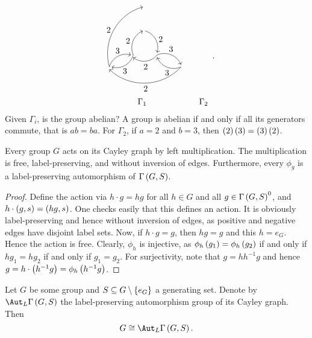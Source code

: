 \begin{example}
\begin{itemize}
$$\begin{array}{ccc}
\begin{tikzpicture}
\draw [->] (0, -1) to [bend left=45] node[right]{$ 2 $} (0.5, -1.9);
\draw [->] (-0.5, -2) to [bend left=45] node[left]{$ 2 $} (-0.1, -1);
\draw [->] (-0.5, -2) to [bend left=45] node[below]{$ 3 $} (-1.4, -2.5);
\draw [->] (0.5, -2) to [bend left=45] node[below]{$ 2 $} (-0.5, -2.1);
\draw [->] (0.5, -2) to [bend left=45] node[above]{$ 3 $} (1.5, -2.4);
\draw [->] (-1.5, -2.5) to [bend left=45] node[left]{$ 2 $} (-0.1, 0);
\draw [->] (-1.5, -2.5) to [bend left=45] node[above]{$ 3 $} (-0.6, -2);
\draw [->] (1.5, -2.5) to [bend left=45] node[below]{$ 3 $} (0.5, -2.1);
\draw [->] (1.5, -2.5) to [bend left=45] node[below]{$ 2 $} (-1.5, -2.6);
\end{tikzpicture}
\\
\Gamma_1 & & \Gamma_2
\end{array}.
$$
Given $ \Gamma_i $, is the group abelian? A group is abelian if and only if all its generators commute, that is $ ab = ba $. For $ \Gamma_2 $, if $ a = 2 $ and $ b = 3 $, then $ \br{2}\br{3} = \br{3}\br{2} $.
\end{itemize}
\end{example}

\pagebreak

\begin{lemma}
\label{lem:1.2.11}
Every group $ G $ acts on its Cayley graph by left multiplication. The multiplication is free, label-preserving, and without inversion of edges. Furthermore, every $ \phi_g $ is a label-preserving automorphism of $ \Gamma\br{G, S} $.
\end{lemma}

\begin{proof}
Define the action via $ h \cdot g = hg $ for all $ h \in G $ and all $ g \in \Gamma\br{G, S}^0 $, and $ h \cdot \br{g, s} = \br{hg, s} $. One checks easily that this defines an action. It is obviously label-preserving and hence without inversion of edges, as positive and negative edges have disjoint label sets. Now, if $ h \cdot g = g $, then $ hg = g $ and this $ h = e_G $. Hence the action is free. Clearly, $ \phi_h $ is injective, as $ \phi_h\br{g_1} = \phi_h\br{g_2} $ if and only if $ hg_1 = hg_2 $ if and only if $ g_1 = g_2 $. For surjectivity, note that $ g = hh^{-1}g $ and hence $ g = h \cdot \br{h^{-1}g} = \phi_h\br{h^{-1}g} $.
\end{proof}


\begin{lemma}
Let $ G $ be some group and $ S \subseteq G \setminus \cbr{e_G} $ a generating set. Denote by $ \Aut_L \Gamma\br{G, S} $ the label-preserving automorphism group of its Cayley graph. Then
$$ G \cong \Aut_L \Gamma\br{G, S}. $$
\end{lemma}

